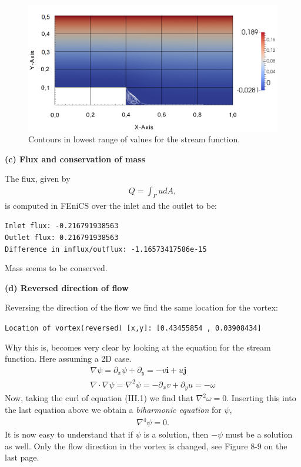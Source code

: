 \documentclass[11pt,a4paper,english]{article}
\numberwithin{equation}{section}
\begin{document}
\begin{figure}[h!]
\begin{center}
  \includegraphics[scale=0.30]{psi_step.png}
  \end{center}
  \caption{Contours in lowest range of values for the stream function.}
\end{figure}

\textbf{(c) Flux and conservation of mass}

The flux, given by 
\begin{align*}
Q = \int_{\Gamma} u dA,
\end{align*}
is computed in FEniCS over the inlet and the outlet to be:

\noindent
\texttt{Inlet flux:  -0.216791938563} \\
\texttt{Outlet flux:  0.216791938563} \\
\texttt{Difference in influx/outflux: -1.16573417586e-15}

Mass seems to be conserved. 


\textbf{(d) Reversed direction of flow}

Reversing the direction of the flow we find the same location for the vortex:

\texttt{Location of vortex(reversed) [x,y]:  [0.43455854 , 0.03908434] }

Why this is, becomes very clear by looking at the equation for the stream function. Here assuming a 2D case.
\begin{align*}
\nabla \psi = \partial_x \psi + \partial_y = -v \mathbf{i} + u \mathbf{j} \\
\nabla \cdot \nabla \psi = \nabla^2 \psi = -\partial_x v + \partial_y u = -\omega 
\end{align*} 
Now, taking the curl of equation (III.1) we find that $\nabla^2 \omega= 0$. Inserting this into the last equation above we obtain a \emph{biharmonic equation} for $\psi$, 
\begin{align*}
\nabla^4 \psi = 0.
\end{align*} 
It is now easy to understand that if $\psi$ is a solution, then $-\psi$ must be a solution as well. Only the flow direction in the vortex is changed, see Figure  8-9 on the last page.  
\end{document}
